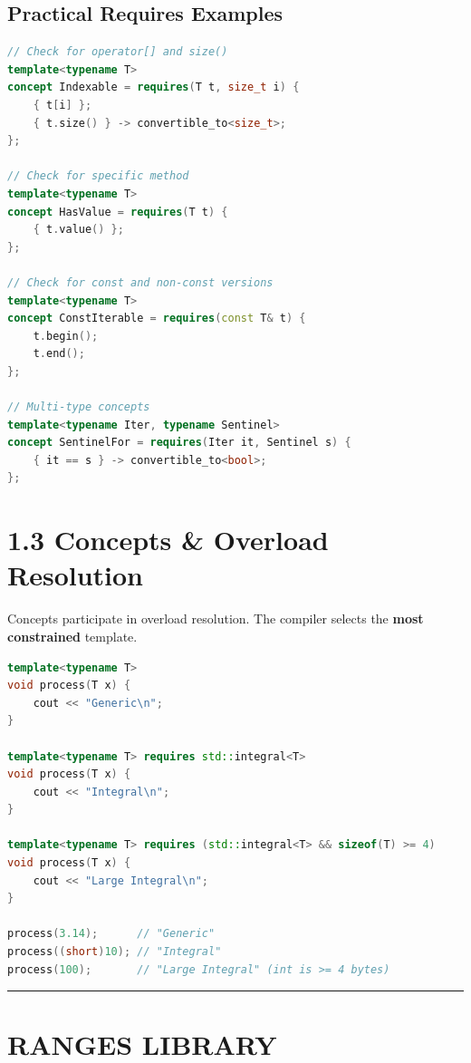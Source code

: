 \hypertarget{practical-requires-examples}{%
\subsection{Practical Requires
Examples}\label{practical-requires-examples}}

\begin{lstlisting}[language={C++}]
// Check for operator[] and size()
template<typename T>
concept Indexable = requires(T t, size_t i) {
    { t[i] };
    { t.size() } -> convertible_to<size_t>;
};

// Check for specific method
template<typename T>
concept HasValue = requires(T t) {
    { t.value() };
};

// Check for const and non-const versions
template<typename T>
concept ConstIterable = requires(const T& t) {
    t.begin();
    t.end();
};

// Multi-type concepts
template<typename Iter, typename Sentinel>
concept SentinelFor = requires(Iter it, Sentinel s) {
    { it == s } -> convertible_to<bool>;
};
\end{lstlisting}

\hypertarget{concepts-overload-resolution}{%
\section{1.3 Concepts \& Overload
Resolution}\label{concepts-overload-resolution}}

Concepts participate in overload resolution. The compiler selects the
\textbf{most constrained} template.

\begin{lstlisting}[language={C++}]
template<typename T>
void process(T x) {
    cout << "Generic\n";
}

template<typename T> requires std::integral<T>
void process(T x) {
    cout << "Integral\n";
}

template<typename T> requires (std::integral<T> && sizeof(T) >= 4)
void process(T x) {
    cout << "Large Integral\n";
}

process(3.14);      // "Generic"
process((short)10); // "Integral"
process(100);       // "Large Integral" (int is >= 4 bytes)
\end{lstlisting}

\begin{center}\rule{0.5\linewidth}{0.5pt}\end{center}

\hypertarget{ranges-library}{%
\section{RANGES LIBRARY}\label{ranges-library}}

